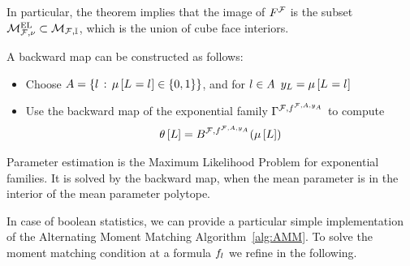 In particular, the theorem implies that the image of $F^{\mathcal{F}}$ is the subset $\mathcal{M}^{\mathrm{EL}}_{\mathcal{F},\nu}\subset\mathcal{M}_{\mathcal{F},\mathbb{I}}$, which is the union of cube face interiors.

A backward map can be constructed as follows:
\begin{itemize}
    \item Choose $A=\{l\,:\,\mu\left[L_{}=l_{}\right]\in\{0,1\}\}$, and for $l\in A$ $y_{L}=\mu\left[L_{}=l_{}\right]$
    \item Use the backward map of the exponential family $\Gamma^{\mathcal{F},f^{\mathcal{F},A,y_{A}}}$ to compute
    \begin{align*}
        \theta\left[L\right] = B^{\mathcal{F},f^{\mathcal{F},A,y_{A}}}(\mu\left[L\right])
    \end{align*}
\end{itemize}





\label{sec:alternatingParEstMLN}

Parameter estimation is the Maximum Likelihood Problem for exponential families.
It is solved by the backward map, when the mean parameter is in the interior of the mean parameter polytope.

\subsubsect{\MarkovLogicNetworks{}}

In case of boolean statistics, we can provide a particular simple implementation of the Alternating Moment Matching Algorithm~\ref{alg:AMM}.
To solve the moment matching condition at a formula $f_{l}$ we refine  in the following.

